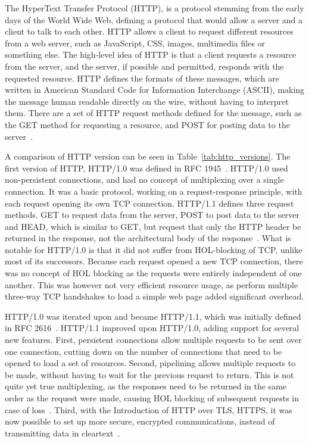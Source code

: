 \documentclass[english, 12pt, a4paper, elec, utf8, a-2b, online]{aaltothesis}
\begin{document}
The HyperText Transfer Protocol (HTTP), is a protocol stemming from the early days 
of the World Wide Web, defining a protocol that would allow a server and a client
to talk to each other. HTTP allows a client to request different resources from a 
web server, such as JavaScript, CSS, images, multimedia files or something else.
The high-level idea of HTTP is that a client requests a resource from the server,
and the server, if possible and permitted, responds with the requested resource.
HTTP defines the formats of these messages, which are written in American Standard Code for Information Interchange (ASCII),
making the message human readable directly on the wire, without having to interpret 
them. There are a set of HTTP request methods defined for the message, such as
the GET method for requesting a resource, and POST for posting data to the server~\cite{compute_rnetworking}.

A comparison of HTTP version can be seen in Table~\ref{tab:http_versions}. 
The first version of HTTP, HTTP/1.0 was defined in RFC 1945~\cite{rfc1945}. HTTP/1.0
used non-persistent connections, and had no concept of multiplexing over a single connection.
It was a basic protocol, working on a request-response principle, with each request opening
its own TCP connection. HTTP/1.1 defines three request methods. GET to request data
from the server, POST to post data to the server and HEAD, which is similar to GET,
but request that only the HTTP header be returned in the response, not the architectural
body of the response~\cite{rfc1945}. What is notable for HTTP/1.0 is that it
did not suffer from HOL-blocking of TCP, unlike most of its successors. Because each
request opened a new TCP connection, there was no concept of HOL blocking as the
requests were entirely independent of one another. This was however not very efficient
resource usage, as perform multiple three-way TCP handshakes to load a simple web page
added significant overhead. 

HTTP/1.0 was iterated upon and became HTTP/1.1, which was initially defined in
RFC 2616~\cite{rfc2616}. HTTP/1.1 improved upon HTTP/1.0, adding support for several
new features. First, persistent connections allow multiple requests to be sent over one connection,
cutting down on the number of connections that need to be opened to load a set of resources.
Second, pipelining allows multiple requests to be made, without having to wait for the
previous request to return. This is not quite yet true multiplexing, as the responses
need to be returned in the same order as the request were made, causing HOL blocking
of subsequent requests in case of loss~\cite{rfc2616}. Third, with the Introduction
of HTTP over TLS, HTTPS, it was now possible to set up more secure, encrypted communications,
instead of transmitting data in cleartext~\cite{rfc2818}.
\end{document}
